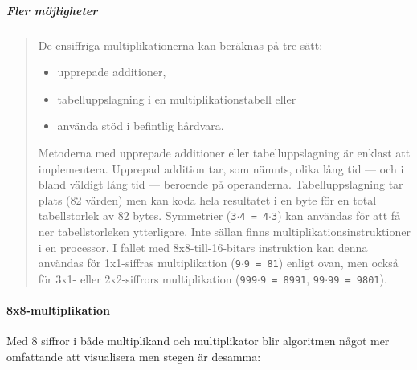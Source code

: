 \documentclass[oneside,10pt,a4paper,swedish]{scrbook}
\newcommand{\asm}[1]{\texttt{#1}}
\begin{document}
\subparagraph{Fler möjligheter}
\begin{quote}
De ensiffriga multiplikationerna kan beräknas på tre sätt: 

\begin{itemize}
\item upprepade additioner, 
\item tabelluppslagning i en multiplikationstabell eller 
\item använda stöd i befintlig hårdvara.
\end{itemize} 

Metoderna med upprepade additioner eller tabelluppslagning är enklast att implementera. Upprepad addition tar, som nämnts, olika lång tid --- och i bland väldigt lång tid --- beroende på operanderna. Tabelluppslagning tar plats (82 värden) men kan koda hela resultatet i en byte för en total tabellstorlek av 82 bytes. Symmetrier (\asm{3}$\cdot$\asm{4 = 4}$\cdot$\asm{3}) kan användas för att få ner tabellstorleken ytterligare. Inte sällan finns multiplikationsinstruktioner i en processor. I fallet med 8x8-till-16-bitars instruktion kan  denna användas för 1x1-siffras multiplikation (\asm{9}$\cdot$\asm{9 = 81}) enligt ovan, men också för 3x1- eller 2x2-siffrors multiplikation (\asm{999}$\cdot$\asm{9 = 8991}, \asm{99}$\cdot$\asm{99 = 9801}). 
\end{quote}

\newpage

\paragraph{8x8-multiplikation}

Med 8 siffror i både multiplikand och multiplikator blir algoritmen något mer omfattande att visualisera men stegen är desamma:
\end{document}

